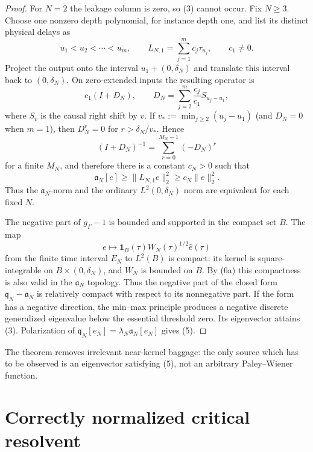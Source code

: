 \documentclass[11pt]{article}
\begin{document}
\begin{proof}
For $N=2$ the leakage column is zero, so (3) cannot occur.  Fix $N\ge3$.
Choose one nonzero depth polynomial, for instance depth one, and list its
distinct physical delays as
\[
 u_1<u_2<\cdots<u_m,
 \qquad
 L_{N,1}=\sum_{j=1}^m c_j\tau_{u_j},
 \qquad c_1\ne0.
\]
Project the output onto the interval $u_1+(0,\delta_N)$ and translate this
interval back to $(0,\delta_N)$.  On zero-extended inputs the resulting
operator is
\[
 c_1(I+D_N),
 \qquad
 D_N=\sum_{j=2}^m\frac{c_j}{c_1}S_{u_j-u_1},
\]
where $S_v$ is the causal right shift by $v$.  If
$v_*:=\min_{j\ge2}(u_j-u_1)$ (and $D_N=0$ when $m=1$), then
$D_N^{r}=0$ for $r>\delta_N/v_*$.  Hence
\[
 (I+D_N)^{-1}=\sum_{r=0}^{M_N-1}(-D_N)^r
\]
for a finite $M_N$, and therefore there is a constant $c_N>0$ such that
\begin{equation}
 \mathfrak a_N[e]\ge \|L_{N,1}e\|_2^2
 \ge c_N\|e\|_2^2.                                      \tag{6a}
\end{equation}
Thus the $\mathfrak a_N$-norm and the ordinary $L^2(0,\delta_N)$ norm
are equivalent for each fixed $N$.

The negative part of $g_\Gamma-1$ is bounded and supported in the compact
set $B$.  The map
\begin{equation}
 e\longmapsto
 \mathbf1_B(\tau)W_N(\tau)^{1/2}\widehat e(\tau)           \tag{6}
\end{equation}
from the finite time interval $E_N$ to $L^2(B)$ is compact: its kernel is
square-integrable on $B\times(0,\delta_N)$, and $W_N$ is bounded on $B$.
By (6a) this compactness is also valid in the $\mathfrak a_N$ topology.
Thus the negative part of the closed form
$\mathfrak q_N-\mathfrak a_N$ is relatively compact with respect to its
nonnegative part.  If the form has a negative direction, the min--max
principle produces a negative discrete generalized eigenvalue below the
essential threshold zero.  Its eigenvector attains (3).  Polarization of
$\mathfrak q_N[e_N]=\lambda_N\mathfrak a_N[e_N]$ gives (5).
\end{proof}

The theorem removes irrelevant near-kernel baggage: the only source which
has to be observed is an eigenvector satisfying (5), not an arbitrary
Paley--Wiener function.

\section{Correctly normalized critical resolvent}
\end{document}
